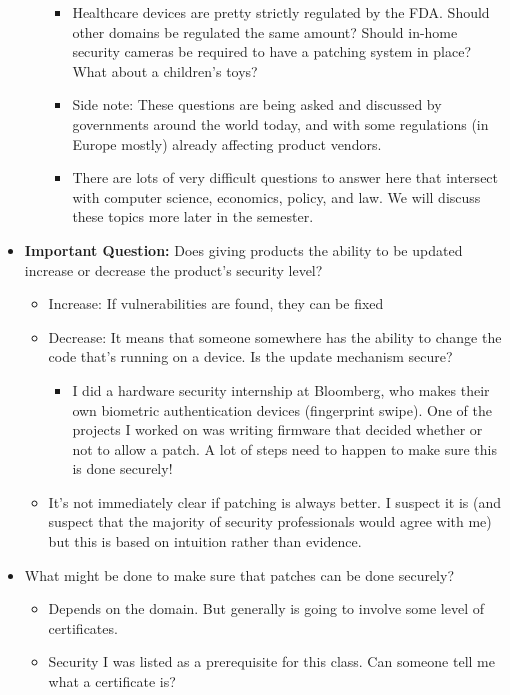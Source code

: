 \documentclass[11pt]{article}
\begin{document}
\begin{itemize}
\begin{itemize}
\begin{itemize}
            \item Healthcare devices are pretty strictly regulated by the FDA. Should other domains be regulated the same amount? Should in-home security cameras be required to have a patching system in place? What about a children's toys?
            \item Side note: These questions are being asked and discussed by governments around the world today, and with some regulations (in Europe mostly) already affecting product vendors.  
            \item There are lots of very difficult questions to answer here that intersect with computer science, economics, policy, and law. We will discuss these topics more later in the semester.
        \end{itemize}
    \end{itemize}
    \item {\bf Important Question:} Does giving products the ability to be updated increase or decrease the product's security level?
    \begin{itemize}
        \item Increase: If vulnerabilities are found, they can be fixed
        \item Decrease: It means that someone somewhere has the ability to change the code that's running on a device. Is the update mechanism secure?
        \begin{itemize}
            \item I did a hardware security internship at Bloomberg, who makes their own biometric authentication devices (fingerprint swipe). One of the projects I worked on was writing firmware that decided whether or not to allow a patch. A lot of steps need to happen to make sure this is done securely!
        \end{itemize}
        \item It's not immediately clear if patching is always better. I suspect it is (and suspect that the majority of security professionals would agree with me) but this is based on intuition rather than evidence. 
    \end{itemize}
    \item What might be done to make sure that patches can be done securely?
    \begin{itemize}
        \item Depends on the domain. But generally is going to involve some level of certificates.
        \item Security I was listed as a prerequisite for this class. Can someone tell me what a certificate is?

\end{itemize}
\end{itemize}
\end{document}
